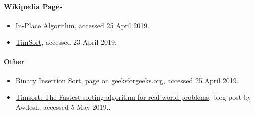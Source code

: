 \documentclass[11pt]{article}
\providecommand{\tightlist}{%
      \setlength{\itemsep}{0pt}\setlength{\parskip}{0pt}}
\begin{document}
    \paragraph{Wikipedia Pages}\label{wikipedia-pages}

\begin{itemize}
\tightlist
\item
  \href{https://en.wikipedia.org/wiki/In-place_algorithm}{In-Place
  Algorithm}, accessed 25 April 2019.
\item
  \href{https://en.wikipedia.org/wiki/Timsort}{TimSort}, accessed 23
  April 2019.
\end{itemize}

    \paragraph{Other}\label{other}

\begin{itemize}
\tightlist
\item
  \href{https://www.geeksforgeeks.org/binary-insertion-sort/}{Binary
  Insertion Sort}, page on geeksforgeeks.org, accessed 25 April 2019.
\item
  \href{https://dev.to/s_awdesh/timsort-fastest-sorting-algorithm-for-real-world-problems--2jhd}{Timsort:
  The Fastest sorting algorithm for real-world problems}, blog post by
  Awdesh, accessed 5 May 2019..
\end{itemize}


    
    
    
    
\end{document}
